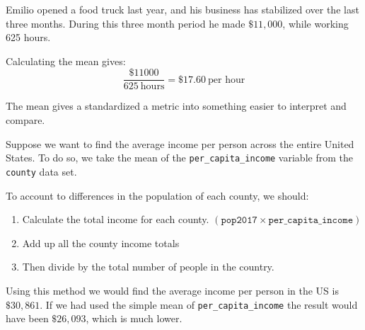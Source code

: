 \documentclass[handout]{beamer}
\begin{document}
\begin{frame}
\begin{example}
Emilio opened a food truck last year, and his business has stabilized over the last three months. During this three month period he made $\$11,000$, while working 625 hours.

\vspace{1mm}
\pause
{}\pause

\vspace{1mm}
Calculating the mean gives:
\begin{equation*}
\dfrac{\$11000}{625~\text{hours}} = \$17.60~\text{per hour}
\end{equation*}
\end{example}\pause

\begin{note}
The mean gives a standardized a metric into something easier to interpret and compare.
\end{note}
\end{frame}

\begin{frame}
\begin{example}
Suppose we want to find the average income per person across the entire United States. To do so, we take the mean of the \texttt{per\_capita\_income} variable from the \texttt{county} data set.

\vspace{1mm}
\pause
{}\pause

\vspace{1mm}
To account to differences in the population of each county, we should:
\begin{enumerate}
\item Calculate the total income for each county. {\small$\left(\texttt{pop2017}\times\texttt{per\_capita\_income}\right)$}\pause
\item Add up all the county income totals\pause
\item Then divide by the total number of people in the country.\pause
\end{enumerate}

Using this method we would find the average income per person in the US is $\$30,861$. If we had used the simple mean of \texttt{per\_capita\_income} the result would have been $\$26,093$, which is much lower.
\end{example}
\end{frame}
\end{document}
